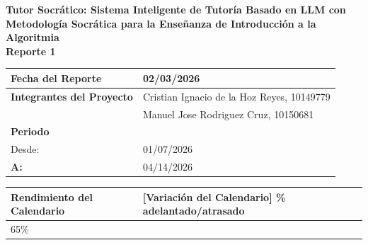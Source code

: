 \documentclass[12pt]{article}
\begin{document}
\begin{center}
    \textbf{Tutor Socrático: Sistema Inteligente de Tutoría Basado en LLM con Metodología Socrática para la Enseñanza de Introducción a la Algoritmia} \\
    \textbf{Reporte 1}
\end{center}

\vspace{1em}

\begin{table}[h]
    \begin{tabularx}{\textwidth}{|l|X|}
        \hline
        \textbf{Fecha del Reporte} & 02/03/2026 \\
        \hline
        \textbf{Integrantes del Proyecto} & Cristian Ignacio de la Hoz Reyes, 10149779 \\
                                          & Manuel Jose Rodriguez Cruz, 10150681 \\
        \hline
        \textbf{Periodo} & \\
        Desde: & 01/07/2026 \\
        \hline
        \textbf{A:} & 04/14/2026 \\
        \hline
    \end{tabularx}
\end{table}

\vspace{1em}

\newpage

\begin{table}[h]
    \begin{tabularx}{\textwidth}{|l|X|}
        \hline
        \textbf{Rendimiento del Calendario} & [Variación del Calendario] \% adelantado/atrasado \\
        \hline
        65\% & \\
        \hline
    \end{tabularx}
\end{table}
\end{document}
